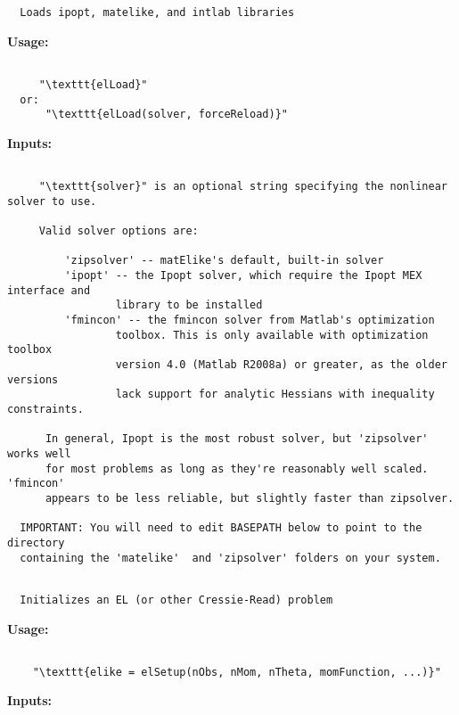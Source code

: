\begin{lstlisting}
  Loads ipopt, matelike, and intlab libraries
 \end{lstlisting}
{\small\textbf{Usage:}}
\begin{lstlisting}
 
     "\texttt{elLoad}"
  or:
      "\texttt{elLoad(solver, forceReload)}"
 \end{lstlisting}
{\small\textbf{Inputs:}}
\begin{lstlisting}
 
     "\texttt{solver}" is an optional string specifying the nonlinear solver to use.
 
     Valid solver options are:
 
         'zipsolver' -- matElike's default, built-in solver
         'ipopt' -- the Ipopt solver, which require the Ipopt MEX interface and
                 library to be installed
         'fmincon' -- the fmincon solver from Matlab's optimization
                 toolbox. This is only available with optimization toolbox
                 version 4.0 (Matlab R2008a) or greater, as the older versions
                 lack support for analytic Hessians with inequality constraints.
 
      In general, Ipopt is the most robust solver, but 'zipsolver' works well
      for most problems as long as they're reasonably well scaled. 'fmincon'
      appears to be less reliable, but slightly faster than zipsolver.
  
  IMPORTANT: You will need to edit BASEPATH below to point to the directory
  containing the 'matelike'  and 'zipsolver' folders on your system.
 

\end{lstlisting}
\begin{lstlisting}
  Initializes an EL (or other Cressie-Read) problem
 \end{lstlisting}
{\small\textbf{Usage:}}
\begin{lstlisting}
 
    "\texttt{elike = elSetup(nObs, nMom, nTheta, momFunction, ...)}"
 \end{lstlisting}
{\small\textbf{Inputs:}}
